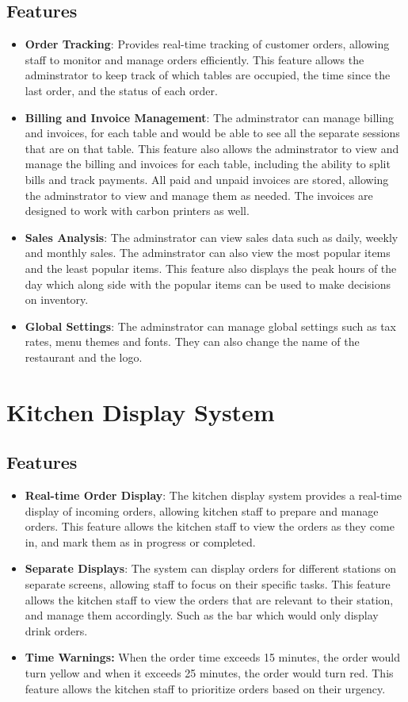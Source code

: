 \subsection{Features}
\begin{itemize}
    \item \textbf{Order Tracking}: Provides real-time tracking of customer orders, allowing staff to monitor and manage orders efficiently. This feature allows the adminstrator to keep track of which tables are occupied, the time since the last order, and the status of each order.
    \item \textbf{Billing and Invoice Management}: The adminstrator can manage billing and invoices, for each table and would be able to see all the separate sessions that are on that table. This feature also allows the adminstrator to view and manage the billing and invoices for each table, including the ability to split bills and track payments. All paid and unpaid invoices are stored, allowing the adminstrator to view and manage them as needed. The invoices are designed to work with carbon printers as well.
    \item \textbf{Sales Analysis}: The adminstrator can view sales data such as daily, weekly and monthly sales. The adminstrator can also view the most popular items and the least popular items. This feature also displays the peak hours of the day which along side with the popular items can be used to make decisions on inventory.
    \item \textbf{Global Settings}: The adminstrator can manage global settings such as tax rates, menu themes and fonts. They can also change the name of the restaurant and the logo.
\end{itemize}

\section{Kitchen Display System}
\subsection{Features}
\begin{itemize}
    \item \textbf{Real-time Order Display}: The kitchen display system provides a real-time display of incoming orders, allowing kitchen staff to prepare and manage orders. This feature allows the kitchen staff to view the orders as they come in, and mark them as in progress or completed.
    \item \textbf{Separate Displays}: The system can display orders for different stations on separate screens, allowing staff to focus on their specific tasks. This feature allows the kitchen staff to view the orders that are relevant to their station, and manage them accordingly. Such as the bar which would only display drink orders.
    \item \textbf{Time Warnings:} When the order time exceeds 15 minutes, the order would turn yellow and when it exceeds 25 minutes, the order would turn red. This feature allows the kitchen staff to prioritize orders based on their urgency.
\end{itemize}

